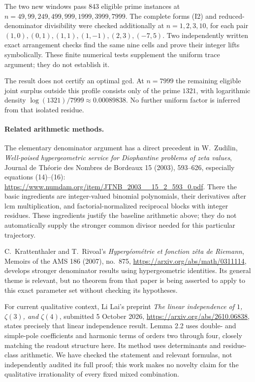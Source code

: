 \documentclass[11pt]{article}
\begin{document}
The two new windows pass 843 eligible prime instances at
$n=49,99,249,499,999,1999,3999,7999$. The complete forms (I2) and
reduced-denominator divisibility were checked additionally at
$n=1,2,3,10$, for each pair
$(1,0),(0,1),(1,1),(1,-1),(2,3),(-7,5)$.
Two independently written exact arrangement checks find the same nine
cells and prove their integer lifts symbolically. These finite numerical
tests supplement the uniform trace argument; they do not establish it.

The result does not certify an optimal gcd. At $n=7999$ the remaining
eligible joint surplus outside this profile consists only of the prime
$1321$, with logarithmic density $\log(1321)/7999\approx0.00089838$.
No further uniform factor is inferred from that isolated residue.
\paragraph{Related arithmetic methods.}
The elementary denominator argument has a direct precedent in
W.~Zudilin, \emph{Well-poised hypergeometric service for Diophantine problems
of zeta values}, Journal de Th\'eorie des Nombres de Bordeaux
15 (2003), 593--626, especially equations (14)--(16):
\url{https://www.numdam.org/item/JTNB_2003__15_2_593_0.pdf}.
There the basic ingredients are integer-valued binomial polynomials,
their derivatives after lcm multiplication, and factorial-normalized
reciprocal blocks with integer residues. These ingredients justify the
baseline arithmetic above; they do not automatically supply the stronger
common divisor needed for this particular trajectory.

C.~Krattenthaler and T.~Rivoal's \emph{Hyperg\'eom\'etrie et fonction z\^eta de
Riemann}, Memoirs of the AMS 186 (2007), no.~875,
\url{https://arxiv.org/abs/math/0311114}, develops stronger denominator
results using hypergeometric identities. Its general theme is relevant,
but no theorem from that paper is being asserted to apply to this exact
parameter set without checking its hypotheses.

For current qualitative context, Li Lai's preprint
\emph{The linear independence of $1$, $\zeta(3)$, and $\zeta(4)$},
submitted 5 October 2026,
\url{https://arxiv.org/abs/2610.06838}, states precisely that linear
independence result. Lemma 2.2 uses double- and simple-pole coefficients
and harmonic terms of orders two through four, closely matching the
readout structure here. Its method uses determinants and residue-class
arithmetic. We have checked the statement and relevant formulas, not
independently audited its full proof; this work makes no novelty claim
for the qualitative irrationality of every fixed mixed combination.
\end{document}

